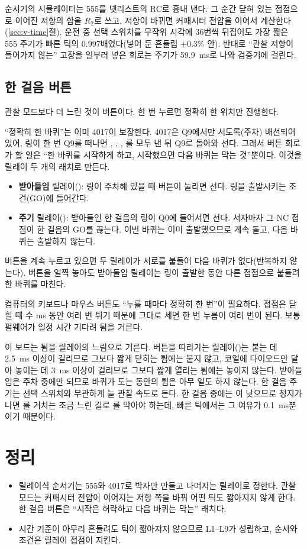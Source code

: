 \Ours 순서기의 시뮬레이터는 555를 넷리스트의 RC로 흉내 낸다. 그 순간 닫혀 있는 접점으로 이어진 저항의 합을
$R_2$로 쓰고, 저항이 바뀌면 커패시터 전압을 이어서 계산한다(\ref{sec:v-time}절). 운전 중 선택 스위치를 무작위
시각에 36번씩 뒤집어도 가장 짧은 555 주기가 빠른 틱의 0.997배였다(넣어 둔 흔들림 $\pm$0.3\% 안). 반대로
``관찰 저항이 들어가지 않는'' 고장을 일부러 넣은 회로는 주기가 59.9~ms로 나와 검증기에 걸린다.

\subsection{한 걸음 버튼}

관찰 모드보다 더 느린 것이  버튼이다. 한 번 누르면 정확히 한 위치만 진행한다.

\Why ``정확히 한 바퀴''는 이미 4017이 보장한다. 4017은 Q9에서만 서도록(주차) 배선되어 있어, 링이 한 번 Q9를
떠나면 , , , 를 모두 낸 뒤 Q9로 돌아와 선다. 그래서 버튼 회로가 할
일은 ``한 바퀴를 시작하게 하고, 시작했으면 다음 바퀴는 막는 것''뿐이다. 이것을 릴레이 두 개의 래치로 만든다.
\begin{itemize}
\item \textbf{받아들임} 릴레이(): 링이 주차해 있을 때 버튼이 눌리면 선다. 링을 출발시키는 조건(GO)에
들어간다.
\item \textbf{주기} 릴레이(): 받아들인 한 걸음의 링이 Q0에 들어서면 선다. 서자마자 그 NC 접점이 한
걸음의 GO를 끊는다. 이번 바퀴는 이미 출발했으므로 계속 돌고, 다음 바퀴는 출발하지 않는다.
\end{itemize}
버튼을 계속 누르고 있으면 두 릴레이가 서로를 붙들어 다음 바퀴가 없다(반복하지 않는다). 버튼을 일찍 놓아도
받아들임 릴레이는 링이 출발한 동안 다른 접점으로 붙들려 한 바퀴를 마친다.

\General 컴퓨터의 키보드나 마우스 버튼도 ``누를 때마다 정확히 한 번''이 필요하다. 접점은 닫힐 때 수 ms 동안
여러 번 튀기 때문에 그대로 세면 한 번 누름이 여러 번이 된다. 보통 펌웨어가 일정 시간 기다려 튐을 거른다.

\Ours 이 보드는 튐을 릴레이의 느림으로 거른다. 버튼을 따라가는 릴레이()는 붙는 데 2.5~ms 이상이
걸리므로 그보다 짧게 닫히는 튐에는 붙지 않고, 코일에 다이오드만 달아 놓이는 데 3~ms 이상이 걸리므로 그보다
짧게 열리는 튐에는 놓이지 않는다. 받아들임은 주차 중에만 되므로 바퀴가 도는 동안의 튐은 아무 일도 하지 않는다.
한 걸음 주기는 선택 스위치와 무관하게 늘 관찰 속도로 돈다. 한 걸음 중에는 이 낮으므로 정지가 나면
를 거치는 조금 느린 길로 를 막아야 하는데, 빠른 틱에서는 그 여유가 0.1~ms뿐이기
때문이다.


\section{정리}

\begin{itemize}
\item 릴레이식 순서기는 555와 4017로 박자만 만들고 나머지는 릴레이로 정한다. 관찰 모드는 커패시터 전압이 이어지는
저항 쪽을 바꿔 어떤 틱도 짧아지지 않게 한다. 한 걸음 버튼은 ``시작은 허락하고 다음 바퀴는 막는'' 래치다.
\item 시간 기준이 아무리 흔들려도 틱이 짧아지지 않으므로 L1--L9가 성립하고, 순서와 조건은 릴레이 접점이 지킨다.
\end{itemize}
